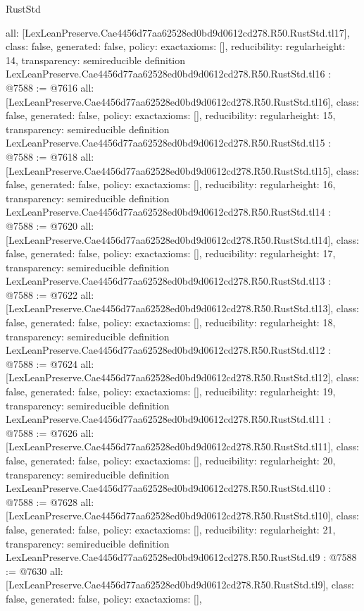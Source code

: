 \begin{lexlean}{RustStd}
\begin{coremodule}
{  all: [LexLeanPreserve.Cae4456d77aa62528ed0bd9d0612cd278.R50.RustStd.tl17],
  class: false,
  generated: false,
  policy: exact{axioms: []},
  reducibility: regular{height: 14},
  transparency: semireducible
}
definition LexLeanPreserve.Cae4456d77aa62528ed0bd9d0612cd278.R50.RustStd.tl16 : @7588 := @7616 {
  all: [LexLeanPreserve.Cae4456d77aa62528ed0bd9d0612cd278.R50.RustStd.tl16],
  class: false,
  generated: false,
  policy: exact{axioms: []},
  reducibility: regular{height: 15},
  transparency: semireducible
}
definition LexLeanPreserve.Cae4456d77aa62528ed0bd9d0612cd278.R50.RustStd.tl15 : @7588 := @7618 {
  all: [LexLeanPreserve.Cae4456d77aa62528ed0bd9d0612cd278.R50.RustStd.tl15],
  class: false,
  generated: false,
  policy: exact{axioms: []},
  reducibility: regular{height: 16},
  transparency: semireducible
}
definition LexLeanPreserve.Cae4456d77aa62528ed0bd9d0612cd278.R50.RustStd.tl14 : @7588 := @7620 {
  all: [LexLeanPreserve.Cae4456d77aa62528ed0bd9d0612cd278.R50.RustStd.tl14],
  class: false,
  generated: false,
  policy: exact{axioms: []},
  reducibility: regular{height: 17},
  transparency: semireducible
}
definition LexLeanPreserve.Cae4456d77aa62528ed0bd9d0612cd278.R50.RustStd.tl13 : @7588 := @7622 {
  all: [LexLeanPreserve.Cae4456d77aa62528ed0bd9d0612cd278.R50.RustStd.tl13],
  class: false,
  generated: false,
  policy: exact{axioms: []},
  reducibility: regular{height: 18},
  transparency: semireducible
}
definition LexLeanPreserve.Cae4456d77aa62528ed0bd9d0612cd278.R50.RustStd.tl12 : @7588 := @7624 {
  all: [LexLeanPreserve.Cae4456d77aa62528ed0bd9d0612cd278.R50.RustStd.tl12],
  class: false,
  generated: false,
  policy: exact{axioms: []},
  reducibility: regular{height: 19},
  transparency: semireducible
}
definition LexLeanPreserve.Cae4456d77aa62528ed0bd9d0612cd278.R50.RustStd.tl11 : @7588 := @7626 {
  all: [LexLeanPreserve.Cae4456d77aa62528ed0bd9d0612cd278.R50.RustStd.tl11],
  class: false,
  generated: false,
  policy: exact{axioms: []},
  reducibility: regular{height: 20},
  transparency: semireducible
}
definition LexLeanPreserve.Cae4456d77aa62528ed0bd9d0612cd278.R50.RustStd.tl10 : @7588 := @7628 {
  all: [LexLeanPreserve.Cae4456d77aa62528ed0bd9d0612cd278.R50.RustStd.tl10],
  class: false,
  generated: false,
  policy: exact{axioms: []},
  reducibility: regular{height: 21},
  transparency: semireducible
}
definition LexLeanPreserve.Cae4456d77aa62528ed0bd9d0612cd278.R50.RustStd.tl9 : @7588 := @7630 {
  all: [LexLeanPreserve.Cae4456d77aa62528ed0bd9d0612cd278.R50.RustStd.tl9],
  class: false,
  generated: false,
  policy: exact{axioms: []},
}
\end{coremodule}
\end{lexlean}
